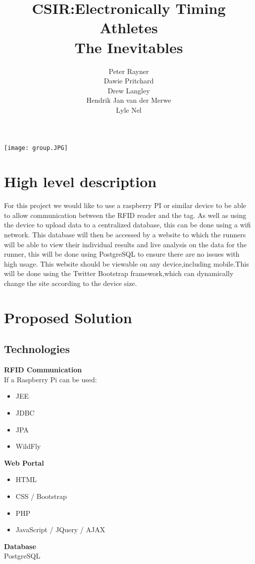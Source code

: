 \documentclass{article}
\title{CSIR:Electronically Timing Athletes\\
The Inevitables
}
\author{  
            Peter Rayner\\
            Dawie Pritchard\\
            Drew Langley\\
            Hendrik Jan van der Merwe\\
            Lyle Nel\\
        }
\begin{document}
\maketitle

\texttt{[image: group.JPG]}

\newpage

\tableofcontents

\newpage


\section{High level description}
For this project we would like to use a raspberry PI or similar device to be able to allow communication between the RFID reader and the tag. As well as using the
device to upload data to a centralized database, this can be done using a wifi network. This database will then be accessed by a website to which the runners will be able to view their individual results and live analysis on the data for the runner, this will be done using PostgreSQL to ensure there are no issues with high usage. This website should be viewable on any device,including mobile.This will be done using the Twitter Bootstrap framework,which can dynamically change the site according to the device size.

\section{Proposed Solution}
\subsection{Technologies}
\textbf{RFID Communication} \\
If a Raspberry Pi can be used:  
\begin{itemize}
	\item JEE
	\item JDBC
	\item JPA
	\item WildFly
\end{itemize}
\textbf{Web Portal} 
\begin{itemize}
	\item HTML
	\item CSS / Bootstrap
	\item PHP
	\item JavaScript / JQuery / AJAX
\end{itemize}
\textbf{Database} \\
PostgreSQL
\end{document}
